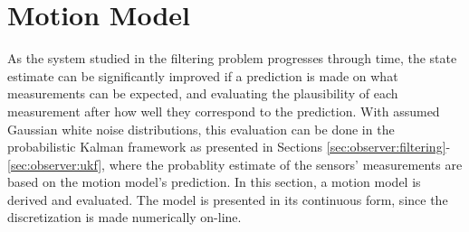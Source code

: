 \section{Motion Model}
\label{sec:observer:motionmodel}
    As the system studied in the filtering problem progresses through time,
    the state estimate can be significantly improved if a prediction
    is made on what measurements can be expected, and evaluating the plausibility
    of each measurement after how well they correspond to the prediction.
    With assumed Gaussian white noise distributions, this evaluation
    can be done in the probabilistic Kalman framework as presented in Sections
    \ref{sec:observer:filtering}-\ref{sec:observer:ukf}, where the
    probablity estimate of the sensors' measurements are based on the motion
    model's prediction. In this section, a motion model is derived and evaluated.
    The model is presented in its continuous form, since the discretization
    is made numerically on-line.

